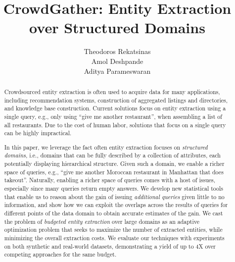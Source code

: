 \documentclass{sig-alternate}
\newif\ifpaper
\begin{document}

\title{CrowdGather: Entity Extraction over Structured Domains}


\author{
	\alignauthor Theodoros Rekatsinas\\
            \alignauthor Amol Deshpande\\
            \alignauthor Aditya Parameswaran \\
}

\maketitle

\begin{abstract}
Crowdsourced entity extraction is often used to acquire data for many applications, including recommendation systems, construction of aggregated listings and directories, and knowledge base construction. Current solutions focus on entity extraction using a single query, e.g., only using ``give me another restaurant'', when assembling a list of all restaurants. Due to the cost of human labor, solutions that focus on a single query can be highly impractical.

In this paper, we leverage the fact often entity extraction focuses on {\em structured domains}, i.e., domains that can be fully described by a collection of attributes, each potentially displaying hierarchical structure. Given such a domain, we enable a richer space of queries, e.g., ``give me another Moroccan restaurant in Manhattan that does takeout''. Naturally, enabling a richer space of queries comes with a host of issues, especially since many queries return empty answers. We develop new statistical tools that enable us to reason about the gain of issuing {\em additional queries} given little to no information, and show how we can exploit the overlaps across the results of queries for different points of the data domain to obtain accurate estimates of the gain. We cast the problem of {\em budgeted entity extraction} over large domains as an adaptive optimization problem that seeks to maximize the number of extracted entities, while minimizing the overall extraction costs. We evaluate our techniques with experiments on both synthetic and real-world datasets, demonstrating a yield of up to 4X over competing approaches for the same budget.
\end{abstract}








\balance

\ifpaper
\scriptsize
\fi


\end{document}
